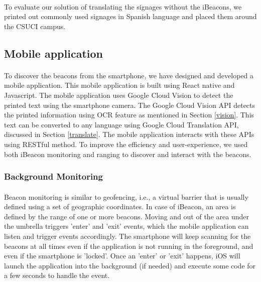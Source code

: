\documentclass[12pt]{article}
\begin{document}
\paragraph{}To evaluate our solution of translating the signages without the iBeacons, we printed out commonly used  signages in Spanish language and placed them around the CSUCI campus. 

\subsection{Mobile application}

\paragraph{}
To discover the beacons from the smartphone, we have designed and developed a mobile application. This mobile application is built using React native and Javascript. The mobile application uses Google Cloud Vision to detect the printed text using the smartphone camera. The Google Cloud Vision API detects the printed information using OCR feature as mentioned in Section  \ref{vision}. This text can be converted to any language using Google Cloud Translation API, discussed in Section \ref{translate}. The mobile application interacts with these APIs using RESTful method. To improve the efficiency and user-experience, we used both iBeacon monitoring and ranging to discover and interact with the beacons.


\subsubsection{Background Monitoring}
\paragraph{}Beacon monitoring is similar to geofencing, i.e., a virtual barrier that is usually defined using a set of geographic coordinates. In case of iBeacon, an area is defined by the range of one or more beacons. Moving and out of the area under the umbrella triggers ’enter’ and ’exit’ events, which the mobile application can listen and trigger events accordingly. The smartphone will keep scanning for the beacons at all times even if the application is not running in the foreground, and even if the smartphone is 'locked'. Once an ’enter’ or ’exit’ happens, iOS will launch the application into the background (if needed) and execute some code for a few seconds to handle the event.
\end{document}
